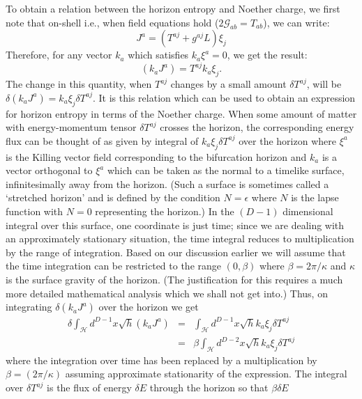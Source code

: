 \documentclass[12pt]{iopart}
\begin{document}
To obtain a relation between the horizon entropy and Noether charge, we first note that
 on-shell i.e., when field equations hold ($2\mathcal{G}_{ab} = T_{ab}$), we can write:
 \begin{equation}
J^a = \left( T^{aj} + g^{aj} L \right) \xi_j
\label{nontriviala}
\end{equation}
Therefore,  for any vector $k_a$ which satisfies $k_a \xi^a =0$, we get the result:
\begin{equation}
(k_a J^a) =T^{aj}k_a\xi_j.
\label{nontrivial}
\end{equation}  
The change in this quantity, when
$T^{aj}$ changes by a small amount $\delta T^{aj}$, will be $\delta (k_aJ^a) = k_a\xi_j\delta T^{aj}$. It is this relation which  can be used to obtain an expression
for horizon entropy in terms of the Noether charge.  When some amount of matter with energy-momentum tensor $\delta T^{aj}$ crosses the horizon, the corresponding energy flux can be thought of as
given by integral of  $k_a\xi_j\delta T^{aj}$ over the horizon
where $\xi^a$ is the Killing vector field corresponding to the bifurcation horizon
and $k_a$ is a vector orthogonal to $\xi^a$ which can be taken as the normal
to a timelike surface, infinitesimally away from the horizon. (Such a surface is sometimes called a `stretched horizon' and is defined by the condition $N=\epsilon$ where $N$ is the lapse function with $N=0$ representing the horizon.) In the $(D-1)$  dimensional integral  over this surface, one coordinate is just time; since we are dealing with an approximately stationary situation, the time integral reduces to multiplication by the range of integration. Based on our discussion earlier
we will assume that the time integration can be restricted to the range  $(0,\beta)$   where $\beta=2\pi/\kappa$ and $\kappa$ is the surface gravity of the horizon. 
(The justification for this requires a much more detailed mathematical analysis which we shall not get into.)
Thus, on integrating
$\delta (k_aJ^a)$ over the horizon we get 
\begin{eqnarray}
\delta \int_\mathcal{H} d^{D-1} x \sqrt{h}  (k_aJ^a) &=&  \int_\mathcal{H} d^{D-1} x \sqrt{h}  k_a\xi_j\delta T^{aj}\nonumber\\
&=& \beta  \int_\mathcal{H} d^{D-2} x \sqrt{h}  k_a\xi_j\delta T^{aj}
\end{eqnarray} 
where the integration over time has been  replaced  by a multiplication
by $\beta = (2\pi/\kappa)$ assuming approximate stationarity of the expression. The integral over $\delta T^{aj}$  is  
the flux of energy $\delta E$ through the horizon so that $\beta\delta E$
\end{document}
